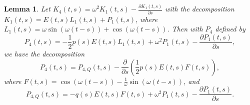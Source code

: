 \documentclass[10pt,reqno]{amsart}
\newtheorem{lemma}[theorem]{Lemma}
\theoremstyle{definition}
\begin{document}
	\begin{lemma} \label{lem:P4_exact_bound}
		Let $K_4(t, s) = \omega^2 K_1(t, s) - \frac{\partial K_1(t, s)}{\partial s}$ with the decomposition $K_1(t, s) = E(t, s)L_1(t, s) + P_1(t, s)$, where $L_1(t, s) = \omega \sin(\omega(t-s)) + \cos(\omega(t-s))$. Then with $P_4$ defined by 
		\[ P_4(t, s) = -\frac{1}{2}p(s)E(t, s)L_1(t, s) + \omega^2 P_1(t, s) - \frac{\partial P_1(t, s)}{\partial s}, \]
		we have the decomposition 
				\[ P_4(t, s) = P_{4, Q}(t, s) - \frac{\partial}{\partial s} \left( \frac{1}{2}p(s) E(t, s) F(t, s) \right), \]
		where $F(t, s) = \cos(\omega(t-s)) - \frac{1}{\omega} \sin(\omega(t-s))$,
		and 
		\[
		 P_{4, Q}(t, s)=-q(s) E(t, s) F(t, s) + \omega^2 P_1(t, s) - \frac{\partial P_1(t, s)}{\partial s}.
		\]
	\end{lemma}
\end{document}

